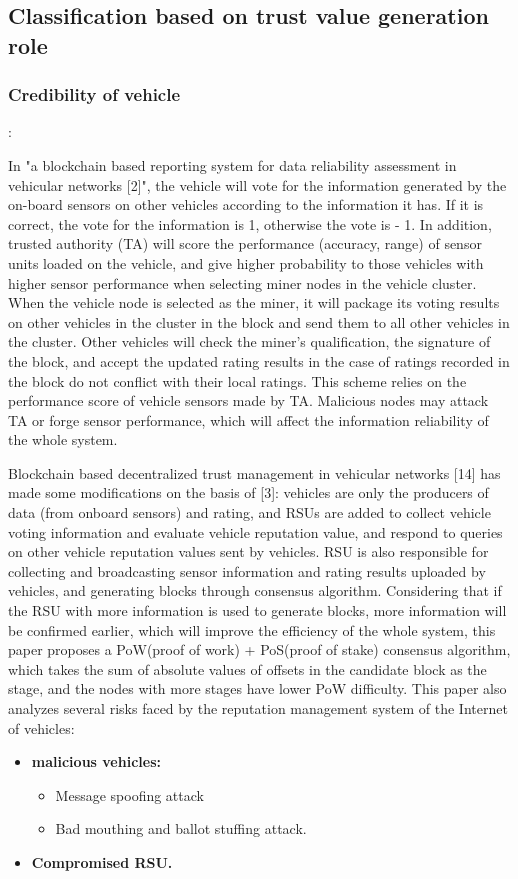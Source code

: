 \subsection{Classification based on trust value generation role}
\subsubsection{\bf Credibility of vehicle}:

In "a blockchain based reporting system for data reliability assessment in vehicular networks [2]", the vehicle will vote for the information generated by the on-board sensors on other vehicles according to the information it has. If it is correct, the vote for the information is 1, otherwise the vote is - 1. In addition, trusted authority (TA) will score the performance (accuracy, range) of sensor units loaded on the vehicle, and give higher probability to those vehicles with higher sensor performance when selecting miner nodes in the vehicle cluster. When the vehicle node is selected as the miner, it will package its voting results on other vehicles in the cluster in the block and send them to all other vehicles in the cluster. Other vehicles will check the miner's qualification, the signature of the block, and accept the updated rating results in the case of ratings recorded in the block do not conflict with their local ratings. This scheme relies on the performance score of vehicle sensors made by TA. Malicious nodes may attack TA or forge sensor performance, which will affect the information reliability of the whole system.

Blockchain based decentralized trust management in vehicular networks [14] has made some modifications on the basis of [3]: vehicles are only the producers of data (from onboard sensors) and rating, and RSUs are added to collect vehicle voting information and evaluate vehicle reputation value, and respond to queries on other vehicle reputation values sent by vehicles. RSU is also responsible for collecting and broadcasting sensor information and rating results uploaded by vehicles, and generating blocks through consensus algorithm. Considering that if the RSU with more information is used to generate blocks, more information will be confirmed earlier, which will improve the efficiency of the whole system, this paper proposes a  PoW(proof of work) + PoS(proof of stake) consensus algorithm, which takes the sum of absolute values of offsets in the candidate block as the stage, and the nodes with more stages have lower PoW difficulty. This paper also analyzes several risks faced by the reputation management system of the Internet of vehicles: 
\begin{itemize}
	\item{ {\bf malicious vehicles:}
		\begin{itemize}
			\item{Message spoofing attack}
			\item{Bad mouthing and ballot stuffing attack.}
		\end{itemize}
	}
	\item{\bf Compromised RSU. }
\end{itemize}

